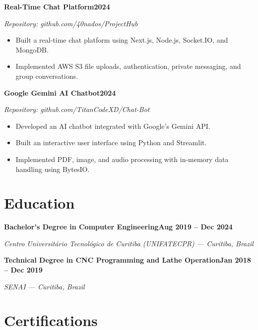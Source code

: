 \documentclass[11pt,a4paper]{article}
\newcommand{\entryheader}[2]{%
\noindent\textbf{#1}\hfill\textbf{#2}\par
}
\newcommand{\entrysub}[1]{%
\noindent\textit{\color{graytext}#1}\par\vspace{2pt}
}
\begin{document}
\entryheader{Real-Time Chat Platform}{2024}

\entrysub{Repository: github.com/40nados/ProjectHub}

\begin{itemize}

\item Built a real-time chat platform using Next.js, Node.js, Socket.IO, and MongoDB.

\item Implemented AWS S3 file uploads, authentication, private messaging, and group conversations.

\end{itemize}

\entryheader{Google Gemini AI Chatbot}{2024}

\entrysub{Repository: github.com/TitanCodeXD/Chat-Bot}

\begin{itemize}

\item Developed an AI chatbot integrated with Google's Gemini API.

\item Built an interactive user interface using Python and Streamlit.

\item Implemented PDF, image, and audio processing with in-memory data handling using BytesIO.

\end{itemize}


\section{Education}

\entryheader{Bachelor's Degree in Computer Engineering}{Aug 2019 -- Dec 2024}

\entrysub{Centro Universitário Tecnológico de Curitiba (UNIFATECPR) --- Curitiba, Brazil}

\entryheader{Technical Degree in CNC Programming and Lathe Operation}{Jan 2018 -- Dec 2019}

\entrysub{SENAI --- Curitiba, Brazil}


\section{Certifications}
\end{document}
